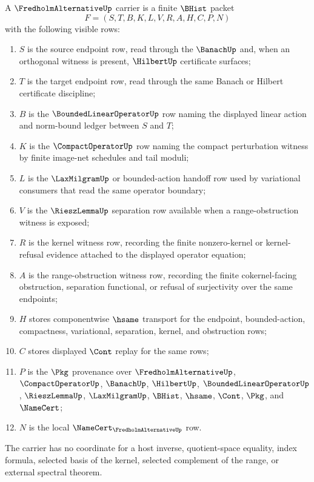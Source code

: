 \begin{definition}
\label{def:fredholm-alternative-carrier}
A $\FredholmAlternativeUp$ carrier is a finite $\BHist$ packet
$$
F=(S,T,B,K,L,V,R,A,H,C,P,N)
$$
with the following visible rows:
\begin{enumerate}
\item $S$ is the source endpoint row, read through the $\BanachUp$ and, when an orthogonal witness is present, $\HilbertUp$ certificate surfaces;
\item $T$ is the target endpoint row, read through the same Banach or Hilbert certificate discipline;
\item $B$ is the $\BoundedLinearOperatorUp$ row naming the displayed linear action and norm-bound ledger between $S$ and $T$;
\item $K$ is the $\CompactOperatorUp$ row naming the compact perturbation witness by finite image-net schedules and tail moduli;
\item $L$ is the $\LaxMilgramUp$ or bounded-action handoff row used by variational consumers that read the same operator boundary;
\item $V$ is the $\RieszLemmaUp$ separation row available when a range-obstruction witness is exposed;
\item $R$ is the kernel witness row, recording the finite nonzero-kernel or kernel-refusal evidence attached to the displayed operator equation;
\item $A$ is the range-obstruction witness row, recording the finite cokernel-facing obstruction, separation functional, or refusal of surjectivity over the same endpoints;
\item $H$ stores componentwise $\hsame$ transport for the endpoint, bounded-action, compactness, variational, separation, kernel, and obstruction rows;
\item $C$ stores displayed $\Cont$ replay for the same rows;
\item $P$ is the $\Pkg$ provenance over $\FredholmAlternativeUp$, $\CompactOperatorUp$, $\BanachUp$, $\HilbertUp$, $\BoundedLinearOperatorUp$, $\RieszLemmaUp$, $\LaxMilgramUp$, $\BHist$, $\hsame$, $\Cont$, $\Pkg$, and $\NameCert$;
\item $N$ is the local $\NameCert_{\FredholmAlternativeUp}$ row.
\end{enumerate}
The carrier has no coordinate for a host inverse, quotient-space equality, index formula, selected basis of the kernel, selected complement of the range, or external spectral theorem.
\end{definition}

